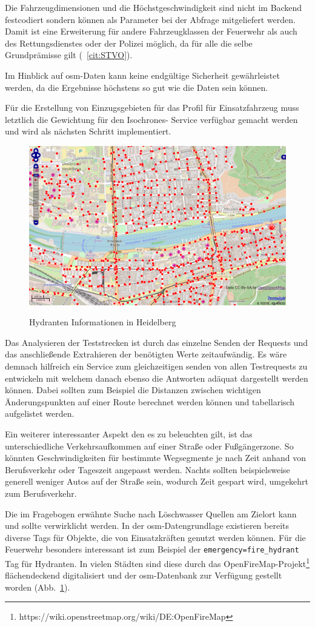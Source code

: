 Die Fahrzeugdimensionen und die Höchstgeschwindigkeit sind nicht im Backend festcodiert sondern können als Parameter bei der Abfrage mitgeliefert werden.
Damit ist eine Erweiterung für andere Fahrzeugklassen der Feuerwehr als auch des Rettungsdienstes oder der Polizei möglich, da für alle die selbe Grundprämisse gilt (~\ref{cit:STVO}).

Im Hinblick auf \gls{osm}-Daten kann keine endgültige Sicherheit gewährleistet werden, da die Ergebnisse höchstens so gut wie die Daten sein können.

Für die Erstellung von Einzugsgebieten für das Profil für Einsatzfahrzeug  muss letztlich die Gewichtung für den Isochrones- Service verfügbar gemacht werden und wird als nächsten Schritt implementiert.

\begin{figure}[htb]
\centering
\caption{Hydranten Informationen in Heidelberg}
\label{fig:firehydrants}
\includegraphics[width = 0.80 \textwidth]{../media/firehydrants.png} \\
\end{figure}

Das Analysieren der Teststrecken ist durch das einzelne Senden der Requests und das anschließende Extrahieren der benötigten Werte zeitaufwändig.
Es wäre demnach hilfreich ein Service zum gleichzeitigen senden von allen Testrequests zu entwickeln mit welchem danach ebenso die Antworten adäquat dargestellt werden können.
Dabei sollten zum Beispiel die Distanzen zwischen wichtigen Änderungspunkten auf einer Route berechnet werden können und tabellarisch aufgelistet werden.

Ein weiterer interessanter Aspekt den es zu beleuchten gilt, ist das unterschiedliche Verkehrsaufkommen auf einer Straße oder Fußgängerzone.
So könnten Geschwindigkeiten für bestimmte Wegsegmente je nach Zeit anhand von Berufsverkehr oder Tageszeit angepasst werden.
Nachts sollten beispielsweise generell weniger Autos auf der Straße sein, wodurch Zeit gespart wird, umgekehrt zum Berufsverkehr.

Die im Fragebogen erwähnte Suche nach Löschwasser Quellen am Zielort kann und sollte verwirklicht werden.
In der \gls{osm}-Datengrundlage existieren bereits diverse Tags für Objekte, die von Einsatzkräften genutzt werden können.
Für die Feuerwehr besonders interessant ist zum Beispiel der \texttt{emergency=fire\_hydrant} Tag für Hydranten.
In vielen Städten sind diese durch das OpenFireMap-Projekt\footnote{https://wiki.openstreetmap.org/wiki/DE:OpenFireMap} flächendeckend digitalisiert und der \gls{osm}-Datenbank zur Verfügung gestellt worden (Abb.~\ref{fig:firehydrants}).